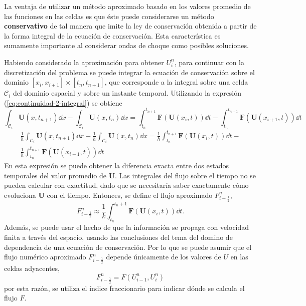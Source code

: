 La ventaja de utilizar un método aproximado basado en los valores promedio de las funciones en las celdas es que éste puede considerarse un método \textbf{conservativo} de tal manera que imite la ley de conservación obtenida a partir de la forma integral de la ecuación de conservación. Esta característica es sumamente importante al considerar ondas de choque como posibles soluciones.

Habiendo considerado la aproximación para obtener $U_i^n$, para continuar con la discretización del problema se puede integrar la ecuación de conservación sobre el dominio $[x_i,x_{i+1}] \times [t_n, t_{n+1}]$, que corresponde a la integral sobre una celda $\mathcal{C}_i$ del dominio espacial y sobre un instante temporal. Utilizando la expresión (\ref{eq:continuidad-2-integral}) se obtiene
\begin{equation}
	\int_{\mathcal{C}_i}\mathbf{U}(x, t_{n+1})\dd{x} - \int_{\mathcal{C}_i}\mathbf{U}(x, t_{n})\dd{x} = \int_{t_n}^{t_{n+1}}\mathbf{F}(\mathbf{U}(x_i,t))\dd{t} - \int_{t_n}^{t_{n+1}}\mathbf{F}(\mathbf{U}(x_{i+1},t))\dd{t}
\end{equation}
\begin{equation}
	\begin{aligned}
		\frac{1}{h}\int_{\mathcal{C}_i}\mathbf{U}(x, t_{n+1})\dd{x} - \frac{1}{h}\int_{\mathcal{C}_i}\mathbf{U}(x, t_{n})\dd{x} = 
		\frac{1}{h}\int_{t_n}^{t_{n+1}}\mathbf{F}(\mathbf{U}(x_i,t))\dd{t} -\\ \frac{1}{h}\int_{t_n}^{t_{n+1}}\mathbf{F}(\mathbf{U}(x_{i+1},t))\dd{t}
	\end{aligned}
\label{eq:integralsobreceldas}
\end{equation}
En esta expresión se puede obtener la diferencia exacta entre dos estados temporales del valor promedio de $\mathbf{U}$. Las integrales del flujo sobre el tiempo no se pueden calcular con exactitud, dado que se necesitaría saber exactamente cómo evoluciona $\mathbf{U}$ con el tiempo. Entonces, se define el flujo aproximado $F_{i-\frac{1}{2}}^n$,
\begin{equation}
	F_{i-\frac{1}{2}}^n \approx \frac{1}{k} \int_{t_n}^{t_n+1} \mathbf{F}(\mathbf{U}(x_i,t)) \dd{t}.
	\label{eq:flujo-numerico}
\end{equation}
Además, se puede usar el hecho de que la información se propaga con velocidad finita a través del espacio, usando las conclusiones del tema del domino de dependencia de una ecuación de conservación. Por lo que se puede asumir que el flujo numérico aproximado $F_{i-\frac{1}{2}}^n$ depende únicamente de los valores de $U$ en las celdas adyacentes,
\begin{equation}
	F_{i-\frac{1}{2}}^n = F(U_{i-1}^n, U_i^n)
\end{equation} 
por esta razón, se utiliza el índice fraccionario para indicar dónde se calcula el flujo $F$. 

